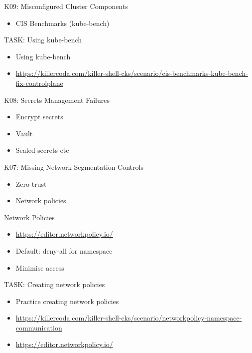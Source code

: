 \documentclass{dcpresentation}
\begin{document}
\begin{frame}{K09: Misconfigured Cluster Components}
  \begin{itemize}
  \item CIS Benchmarks (kube-bench)
  \end{itemize}
\end{frame}


\begin{frame}{TASK: Using kube-bench}
 \begin{itemize}
  \item Using kube-bench
  \item \url{https://killercoda.com/killer-shell-cks/scenario/cis-benchmarks-kube-bench-fix-controlplane}
 \end{itemize}
\end{frame}


\begin{frame}{K08: Secrets Management Failures}
  \begin{itemize}
  \item Encrypt secrets
  \item Vault
  \item Sealed secrets etc
  \end{itemize}
\end{frame}


\begin{frame}{K07: Missing Network Segmentation Controls}
  \begin{itemize}
  \item Zero trust 
  \item Network policies
  \end{itemize}
\end{frame}

\begin{frame}{Network Policies}
  \begin{itemize}
  \item \url{https://editor.networkpolicy.io/}
  \item Default: deny-all for namespace
  \item Minimise access
  \end{itemize}
\end{frame}
 
\begin{frame}{TASK: Creating network policies}
 \begin{itemize}
   \item Practice creating network policies
   \item \url{https://killercoda.com/killer-shell-cks/scenario/networkpolicy-namespace-communication}
   \item \url{https://editor.networkpolicy.io/}
 \end{itemize}
\end{frame}
\end{document}
